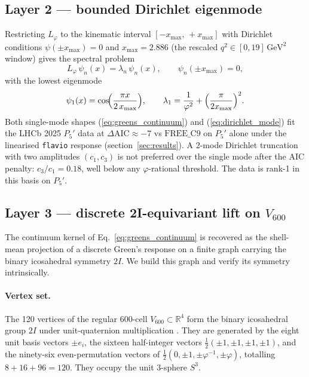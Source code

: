 \subsection{Layer 2 — bounded Dirichlet eigenmode}\label{subsec:layer2}

Restricting $L_{\varphi}$ to the kinematic interval $[-x_{\max},\,
+x_{\max}]$ with Dirichlet conditions $\psi(\pm x_{\max})=0$ and
$x_{\max}=2.886$ (the rescaled
$q^{2}\in[0,19]\,\mathrm{GeV}^{2}$ window) gives the spectral problem
\begin{equation}
L_{\varphi}\, \psi_{n}(x) = \lambda_{n}\, \psi_{n}(x),
\qquad
\psi_{n}(\pm x_{\max}) = 0,
\end{equation}
with the lowest eigenmode
\begin{equation}\label{eq:dirichlet_mode}
\psi_{1}(x) = \cos\!\Bigl(\frac{\pi x}{2\,x_{\max}}\Bigr),
\qquad
\lambda_{1} = \frac{1}{\varphi^{2}} + \Bigl(\frac{\pi}{2 x_{\max}}\Bigr)^{2}.
\end{equation}
Both single-mode shapes (\ref{eq:greens_continuum}) and
(\ref{eq:dirichlet_mode}) fit the LHCb 2025 $P_{5}'$ data at
$\Delta\mathrm{AIC}\approx -7$ vs $\mathrm{FREE\_C9}$ on $P_{5}'$ alone
under the linearised \texttt{flavio} response (section~\ref{sec:results}).
A 2-mode Dirichlet truncation with two amplitudes
$(c_{1}, c_{3})$ is not preferred over the single mode after the
AIC penalty: $c_{3}/c_{1} = 0.18$, well below any $\varphi$-rational
threshold. The data is rank-1 in this basis on $P_{5}'$.

\subsection{Layer 3 — discrete 2I-equivariant lift on $V_{600}$}\label{subsec:layer3}

The continuum kernel of Eq.~\eqref{eq:greens_continuum} is recovered as
the shell-mean projection of a discrete Green's response on a finite
graph carrying the binary icosahedral symmetry $2I$. We build this
graph and verify its symmetry intrinsically.

\paragraph{Vertex set.} The 120 vertices of the regular 600-cell
$V_{600}\subset\mathbb{R}^{4}$ form the binary icosahedral group $2I$
under unit-quaternion multiplication
\citep{Coxeter1973RegularPolytopes,Conway2003Quaternions}. They are
generated by the eight unit basis vectors $\pm e_{i}$, the sixteen
half-integer vectors $\tfrac{1}{2}(\pm 1, \pm 1, \pm 1, \pm 1)$, and
the ninety-six even-permutation vectors of
$\tfrac{1}{2}(0, \pm 1, \pm \varphi^{-1}, \pm \varphi)$, totalling
$8+16+96 = 120$. They occupy the unit 3-sphere $S^{3}$.

